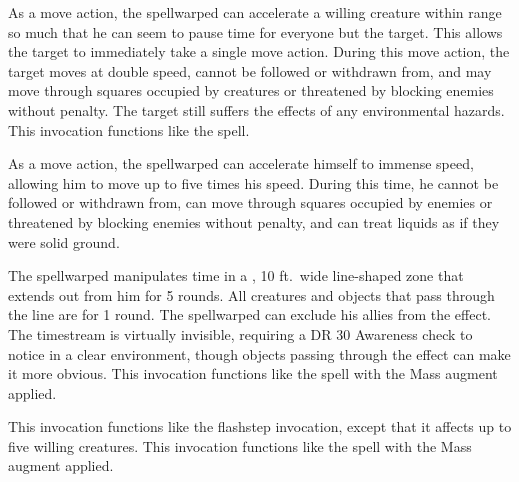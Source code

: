             As a move action, the spellwarped can accelerate a willing creature within \rngclose range so much that he can seem to pause time for everyone but the target.
            This allows the target to immediately take a single move action.
            During this move action, the target moves at double speed, cannot be followed or withdrawn from, and may move through squares occupied by creatures or threatened by blocking enemies without penalty.
            The target still suffers the effects of any environmental hazards.
            This invocation functions like the  spell.

            As a move action, the spellwarped can accelerate himself to immense speed, allowing him to move up to five times his speed.
            During this time, he cannot be followed or withdrawn from, can move through squares occupied by enemies or threatened by blocking enemies without penalty, and can treat liquids as if they were solid ground.

            The spellwarped manipulates time in a \arealarge, 10 ft.\ wide line-shaped zone that extends out from him for 5 rounds.
            All creatures and objects that pass through the line are \slowed for 1 round.
            The spellwarped can exclude his allies from the effect.
            The timestream is virtually invisible, requiring a DR 30 Awareness check to notice in a clear environment, though objects passing through the effect can make it more obvious.
            This invocation functions like the  spell with the Mass augment applied.

            This invocation functions like the flashstep invocation, except that it affects up to five willing creatures.
            This invocation functions like the  spell with the Mass augment applied.

